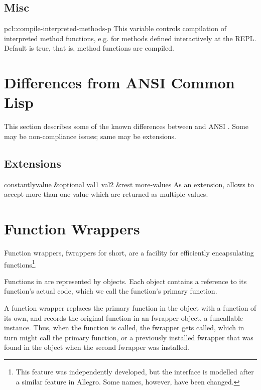 \subsection{Misc}

\begin{defvar}{pcl::}{compile-interpreted-methods-p}
  This variable controls compilation of interpreted method functions,
  e.g. for methods defined interactively at the REPL.  Default is
  true, that is, method functions are compiled.
\end{defvar}





\section{Differences from ANSI Common Lisp}
This section describes some of the known differences between \cmucl{}
and ANSI \clisp{}.  Some may be non-compliance issues; same may be
extensions.

\subsection{Extensions}

\begin{defun}{}{constantly}{value \&optional val1 val2 \&rest
    more-values}
  As an extension, \cmucl{} allows  to accept more
  than one value which are returned as multiple values.
\end{defun}




\section{Function Wrappers}

Function wrappers, fwrappers for short, are a facility for efficiently
encapsulating functions\footnote{This feature was independently
developed, but the interface is modelled after a similar feature in
Allegro.  Some names, however, have been changed.}.

Functions in \cmucl{} are represented by 
objects.  Each  object contains a reference to its
function's actual code, which we call the function's primary function.

A function wrapper replaces the primary function in the 
object with a function of its own, and records the original function
in an fwrapper object, a funcallable instance.  Thus, when the
function is called, the fwrapper gets called, which in turn might call
the primary function, or a previously installed fwrapper that was
found in the  object when the second fwrapper was
installed.

